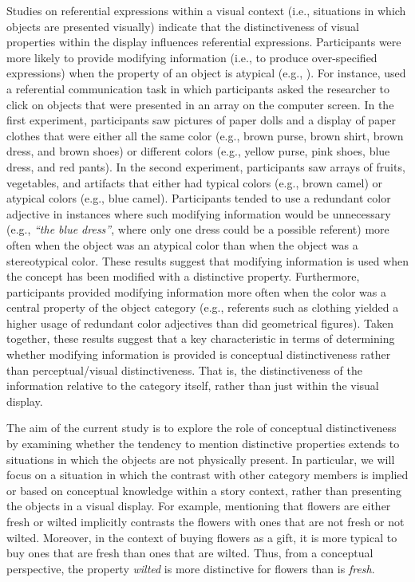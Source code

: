 \documentclass[output=paper]{langsci/langscibook}
\begin{document}
Studies on referential expressions within a visual context (i.e.,
situations in which objects are presented visually) indicate that the
distinctiveness of visual properties within the display influences
referential expressions. Participants were more likely to provide
modifying information (i.e., to produce over-specified expressions)
when the property of an object is atypical (e.g., \citealt{westerbeek2015stored}). For instance, \citet{rubio2016redundant} used a referential
communication task in which participants asked the researcher to click
on objects that were presented in an array on the computer screen. In
the first experiment, participants saw pictures of paper dolls and a
display of paper clothes that were either all the same color (e.g.,
brown purse, brown shirt, brown dress, and brown shoes) or different
colors (e.g., yellow purse, pink shoes, blue dress, and red pants). In
the second experiment, participants saw arrays of fruits, vegetables,
and artifacts that either had typical colors (e.g., brown camel) or
atypical colors (e.g., blue camel).  Participants tended to use a
redundant color adjective in instances where such modifying
information would be unnecessary (e.g., \textit{“the blue dress”},
where only one dress could be a possible referent) more often when the
object was an atypical color than when the object was a stereotypical
color. These results suggest that modifying information is used when
the concept has been modified with a distinctive
property. Furthermore, participants provided modifying information
more often when the color was a central property of the object
category (e.g., referents such as clothing yielded a higher usage of
redundant color adjectives than did geometrical figures). Taken
together, these results suggest that a key characteristic in terms of
determining whether modifying information is provided is conceptual
distinctiveness rather than perceptual/visual distinctiveness.  That
is, the distinctiveness of the information relative to the category
itself, rather than just within the visual display.

The aim of the current study is to explore the role of conceptual
distinctiveness by examining whether the tendency to mention
distinctive properties extends to situations in which the objects are
not physically present. In particular, we will focus on a situation in
which the contrast with other category members is implied or based on
conceptual knowledge within a story context, rather than presenting
the objects in a visual display. For example, mentioning that flowers
are either fresh or wilted implicitly contrasts the flowers with ones
that are not fresh or not wilted. Moreover, in the context of buying
flowers as a gift, it is more typical to buy ones that are fresh than
ones that are wilted. Thus, from a conceptual perspective, the
property \textit{wilted} is more distinctive for flowers than is
\textit{fresh}.
\end{document}
